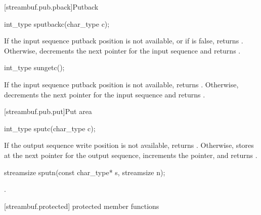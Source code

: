 [streambuf.pub.pback]{Putback}

%
\begin{itemdecl}
int_type sputbackc(char_type c);
\end{itemdecl}

\begin{itemdescr}
\pnum
\returns
If the input sequence putback position is not available, or
if
is false, returns
.
Otherwise, decrements the next pointer for the input sequence and
returns
.
\end{itemdescr}

%
\begin{itemdecl}
int_type sungetc();
\end{itemdecl}

\begin{itemdescr}
\pnum
\returns
If the input sequence putback position is not available,
returns
.
Otherwise, decrements the next pointer for the input sequence and
returns
.
\end{itemdescr}

[streambuf.pub.put]{Put area}

%
\begin{itemdecl}
int_type sputc(char_type c);
\end{itemdecl}

\begin{itemdescr}
\pnum
\returns
If the output sequence write position is not available,
returns
.
Otherwise, stores  at the next pointer for the output sequence,
increments the pointer, and
returns
.
\end{itemdescr}

%
\begin{itemdecl}
streamsize sputn(const char_type* s, streamsize n);
\end{itemdecl}

\begin{itemdescr}
\pnum
\returns
{}.
\end{itemdescr}

[streambuf.protected]{ protected member functions}

